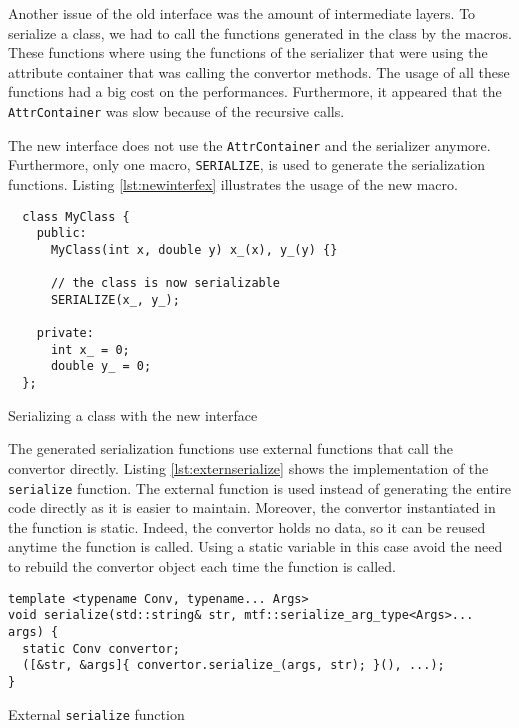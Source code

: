 Another issue of the old interface was the amount of intermediate layers. To
serialize a class, we had to call the functions generated in the class by the
macros. These functions where using the functions of the serializer that were
using the attribute container that was calling the convertor methods. The
usage of all these functions had a big cost on the performances. Furthermore, it
appeared that the \texttt{AttrContainer} was slow because of the recursive
calls.

The new interface does not use the \texttt{AttrContainer} and the serializer
anymore. Furthermore, only one macro, \texttt{SERIALIZE}, is used to generate
the serialization functions. Listing \ref{lst:newinterfex} illustrates the usage
of the new macro.

\begin{listing}[ht!]
\begin{verbatim}
  class MyClass {
    public:
      MyClass(int x, double y) x_(x), y_(y) {}

      // the class is now serializable
      SERIALIZE(x_, y_);

    private:
      int x_ = 0;
      double y_ = 0;
  };
\end{verbatim}
\caption{Serializing a class with the new interface}
\label{lst:newinterfex}
\end{listing}

The generated serialization functions use external functions that call the
convertor directly. Listing \ref{lst:externserialize} shows the implementation
of the \texttt{serialize} function. The external function is used instead of
generating the entire code directly as it is easier to maintain. Moreover, the
convertor instantiated in the function is static. Indeed, the convertor holds no
data, so it can be reused anytime the function is called. Using a static
variable in this case avoid the need to rebuild the convertor object each time
the function is called.

\begin{listing}[ht!]
\begin{verbatim}
template <typename Conv, typename... Args>
void serialize(std::string& str, mtf::serialize_arg_type<Args>... args) {
  static Conv convertor;
  ([&str, &args]{ convertor.serialize_(args, str); }(), ...);
}
\end{verbatim}
\caption{External \texttt{serialize} function}
\label{lst:externserialize}
\end{listing}


